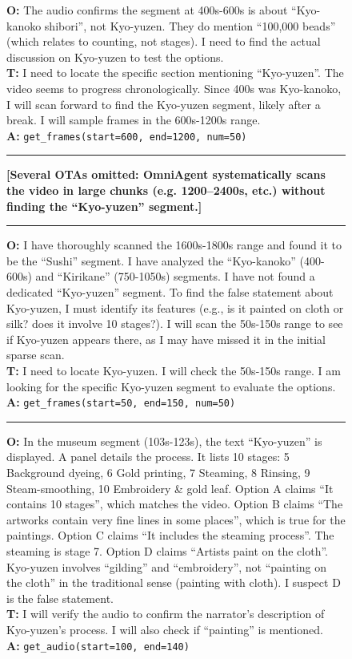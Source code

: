 \documentclass{article}
\theoremstyle{plain}
\theoremstyle{definition}
\theoremstyle{remark}
\begin{document}
\begin{figure}[!ht]
\begin{minipage}{0.95\textwidth}
    \textbf{O:} The audio confirms the segment at 400s-600s is about ``Kyo-kanoko shibori'', not Kyo-yuzen. They do mention ``100,000 beads'' (which relates to counting, not stages). I need to find the actual discussion on Kyo-yuzen to test the options.\\
    \textbf{T:} I need to locate the specific section mentioning ``Kyo-yuzen''. The video seems to progress chronologically. Since 400s was Kyo-kanoko, I will scan forward to find the Kyo-yuzen segment, likely after a break. I will sample frames in the 600s-1200s range.\\
    \textbf{A:} \texttt{get\_frames(start=600, end=1200, num=50)}

    \vspace{0.2em}\hrule\vspace{0.2em}
    
    \textbf{[Several OTAs omitted: OmniAgent systematically scans the video in large chunks (e.g. 1200--2400s, etc.) without finding the ``Kyo-yuzen'' segment.]}

    \vspace{0.2em}\hrule\vspace{0.2em}

    \textbf{O:} I have thoroughly scanned the 1600s-1800s range and found it to be the ``Sushi'' segment. I have analyzed the ``Kyo-kanoko'' (400-600s) and ``Kirikane'' (750-1050s) segments. I have not found a dedicated ``Kyo-yuzen'' segment. To find the false statement about Kyo-yuzen, I must identify its features (e.g., is it painted on cloth or silk? does it involve 10 stages?). I will scan the 50s-150s range to see if Kyo-yuzen appears there, as I may have missed it in the initial sparse scan.\\
    \textbf{T:}  I need to locate Kyo-yuzen. I will check the 50s-150s range. I am looking for the specific Kyo-yuzen segment to evaluate the options. \\
    \textbf{A:} \texttt{get\_frames(start=50, end=150, num=50)}

    \vspace{0.2em}\hrule\vspace{0.2em}
    
    \textbf{O:} In the museum segment (103s-123s), the text ``Kyo-yuzen'' is displayed. A panel details the process. It lists 10 stages: 5 Background dyeing, 6 Gold printing, 7 Steaming, 8 Rinsing, 9 Steam-smoothing, 10 Embroidery \& gold leaf. Option A claims ``It contains 10 stages'', which matches the video. Option B claims ``The artworks contain very fine lines in some places'', which is true for the paintings. Option C claims ``It includes the steaming process''. The steaming is stage 7. Option D claims ``Artists paint on the cloth''. Kyo-yuzen involves ``gilding'' and ``embroidery'', not ``painting on the cloth'' in the traditional sense (painting with cloth). I suspect D is the false statement.\\
    \textbf{T:} I will verify the audio to confirm the narrator's description of Kyo-yuzen's process. I will also check if ``painting'' is mentioned.\\
    \textbf{A:} \texttt{get\_audio(start=100, end=140)}


\end{minipage}
\end{figure}
\end{document}
